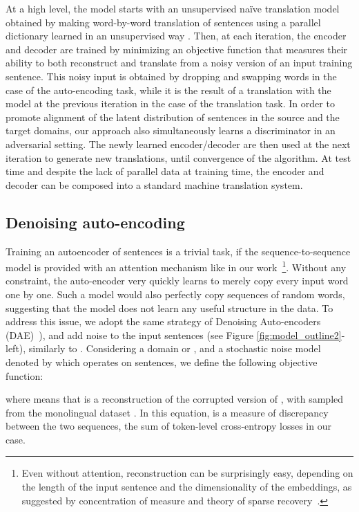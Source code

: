 \documentclass{article} \usepackage{iclr2018_conference,times}
\begin{document}
At a high level, the model starts with an unsupervised na\"ive translation model obtained by making word-by-word translation of sentences using a parallel dictionary learned in an unsupervised way \citep{wordalign17}. Then, at each iteration, the encoder and decoder are trained by minimizing an objective function that measures their ability 
to both reconstruct and translate from a noisy version of an input training sentence. This noisy input is obtained by dropping and swapping words in the case of the auto-encoding task, while it is the result of a translation with the model at the previous iteration in the case of the translation task. In order to promote alignment of the latent distribution of sentences in the source and the target domains, our approach also simultaneously learns a discriminator in an adversarial setting. The newly learned encoder/decoder are then used at the next iteration to generate new translations, until convergence of the algorithm. At test time and despite the lack of parallel data at training time, the encoder and decoder can be composed into a standard machine translation system. 

\subsection{Denoising auto-encoding} \label{sec:ae} Training an autoencoder of sentences is a trivial task, if the sequence-to-sequence model is provided with an attention mechanism like in our work~\footnote{Even without attention, reconstruction can be surprisingly easy, depending on the length of the input sentence and the dimensionality of the embeddings, as suggested by concentration of measure and theory of sparse recovery~\citep{compressedsensing}.}. Without any constraint,  the auto-encoder very quickly learns to merely copy every input word one by one. Such a model would also perfectly copy sequences of random words, suggesting that the model does not learn any useful structure in the data.  To address this issue, we adopt the same strategy of Denoising Auto-encoders (DAE)~\citep{vincent2008extracting}), and add noise to the input sentences (see Figure \ref{fig:model_outline2}-left), similarly to \cite{hill2016learning}. Considering a domain  or , and a stochastic noise model denoted by  which operates on sentences, we define the following objective function:

where  means that  is a reconstruction of the corrupted version of , with  sampled from the monolingual dataset .  In this equation,  is a
measure of discrepancy between the two sequences, the sum of token-level cross-entropy losses in our case.
\end{document}
